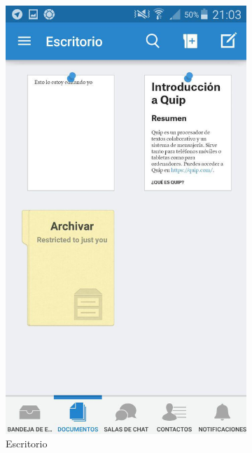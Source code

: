 	\begin{figure}[H]
        \centering
        \begin{subfigure}[b]{0.3\textwidth}
                \includegraphics[width=\textwidth]{Media/Captures/quipDesktop.jpg}
                \caption{Escritorio}
                \label{fig:quipDesktop}
        \end{subfigure}
        ~
        \begin{subfigure}[b]{0.3\textwidth}

\end{subfigure}
\end{figure}
